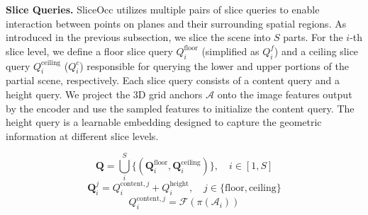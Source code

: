 \documentclass[letterpaper, 10 pt, conference]{ieeeconf}  %
\begin{document}

\textbf{Slice Queries.} SliceOcc utilizes multiple pairs of slice queries to enable interaction between points on planes and their surrounding spatial regions. As introduced in the previous subsection, we slice the scene into $S$ parts. For the $i$-th slice level, we define a floor slice query $Q^{\text{floor}}_{i}$ (simplified as $Q^{f}_{i}$) and a ceiling slice query $Q^{\text{ceiling}}_{i}$ ($Q^{c}_{i}$) responsible for querying the lower and upper portions of the partial scene, respectively. Each slice query consists of a content query and a height query. We project the 3D grid anchors $\mathcal{A}$ onto the image features output by the encoder and use the sampled features to initialize the content query. The height query is a learnable embedding designed to capture the geometric information at different slice levels.



\vspace{-10pt}
\begin{equation}
    \mathbf{Q} = \bigcup_{i}^{S} \{ ( \mathbf{Q}^{\text{floor}}_{i}, \mathbf{Q}^{\text{ceiling}}_{i} ) \}, \quad i \in [1, S]
\end{equation}
\vspace{-10pt}
\begin{equation}
    \mathbf{Q}^{j}_{i} = Q^{\text{content}, j}_{i} + Q^{\text{height}}_{i}, \quad j \in \{\text{floor}, \text{ceiling}\}
\end{equation}
\vspace{-10pt}
\begin{equation}
    Q^{\text{content}, j}_{i} = \mathcal{F}(\pi(\mathcal{A}_{i}))
\end{equation}
\end{document}
